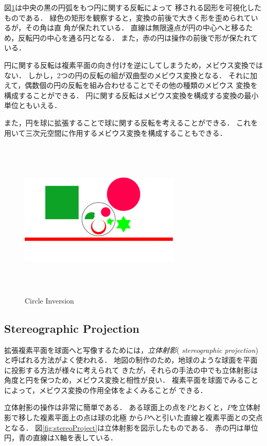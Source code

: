 図\ref{fig:circleInversion}は中央の黒の円弧をもつ円に関する反転によって
移される図形を可視化したものである．
緑色の矩形を観察すると，変換の前後で大きく形を歪められているが，その角は直
角が保たれている．
直線は無限遠点が円の中心へと移るため，反転円の中心を通る円となる．
また，赤の円は操作の前後で形が保たれている．

円に関する反転は複素平面の向き付けを逆にしてしまうため，メビウス変換では
ない．
しかし，2つの円の反転の組が双曲型のメビウス変換となる．
それに加えて，偶数個の円の反転を組み合わせることでその他の種類のメビウス
変換を構成することができる．
円に関する反転はメビウス変換を構成する変換の最小単位ともいえる．

また，円を球に拡張することで球に関する反転を考えることができる．
これを用いて三次元空間に作用するメビウス変換を構成することもできる．

\begin{figure}[htbp]
 \center
 \includegraphics[width=3in, height=3in, keepaspectratio]{../img/klein/circleInversion.pdf}
 \caption{Circle Inversion}
 \label{fig:circleInversion}
\end{figure}

\subsection{Stereographic Projection}

拡張複素平面を球面へと写像するためには，\emph{立体射影}({\it
stereographic projection})と呼ばれる方法がよく使われる．
地図の制作のため，地球のような球面を平面に投影する方法が様々に考えられて
きたが，それらの手法の中でも立体射影は角度と円を保つため，メビウス変換と相性が良い．
複素平面を球面でみることによって，メビウス変換の作用全体をよくみることが
できる．

立体射影の操作は非常に簡単である．
ある球面上の点を$P$とおくと，$P$を立体射影で移した複素平面上の点は球の北極
から$P$へと引いた直線と複素平面との交点となる．
図\ref{fig:stereoProject}は立体射影を図示したものである．
赤の円は単位円，青の直線はX軸を表している．

